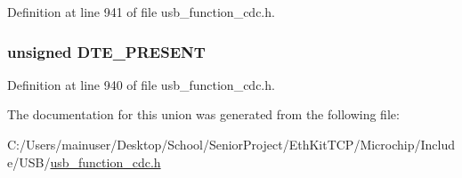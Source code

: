 Definition at line 941 of file usb\+\_\+function\+\_\+cdc.\+h.

\hypertarget{union___c_o_n_t_r_o_l___s_i_g_n_a_l___b_i_t_m_a_p_abd62ba5a2ebbfe1cf985381168371760}{}
\subsubsection[{D\+T\+E\+\_\+\+P\+R\+E\+S\+E\+N\+T}]{\setlength{\rightskip}{0pt plus 5cm}unsigned D\+T\+E\+\_\+\+P\+R\+E\+S\+E\+N\+T}\label{union___c_o_n_t_r_o_l___s_i_g_n_a_l___b_i_t_m_a_p_abd62ba5a2ebbfe1cf985381168371760}


Definition at line 940 of file usb\+\_\+function\+\_\+cdc.\+h.



The documentation for this union was generated from the following file\+:\begin{DoxyCompactItemize}
\item 
C\+:/\+Users/mainuser/\+Desktop/\+School/\+Senior\+Project/\+Eth\+Kit\+T\+C\+P/\+Microchip/\+Include/\+U\+S\+B/\hyperlink{usb__function__cdc_8h}{usb\+\_\+function\+\_\+cdc.\+h}\end{DoxyCompactItemize}
